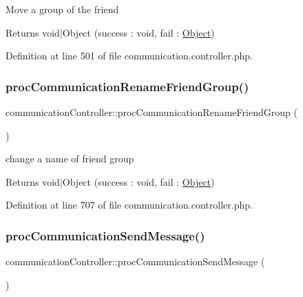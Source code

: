 Move a group of the friend \begin{DoxyReturn}{Returns}
void$\vert$\+Object (success \+: void, fail \+: \hyperlink{classObject}{Object}) 
\end{DoxyReturn}


Definition at line 501 of file communication.\+controller.\+php.

\hypertarget{classcommunicationController_acdfb1b461be46bd6fa56be917fe04d37}{}\label{classcommunicationController_acdfb1b461be46bd6fa56be917fe04d37} 
\subsubsection{\texorpdfstring{proc\+Communication\+Rename\+Friend\+Group()}{procCommunicationRenameFriendGroup()}}
{\footnotesize\ttfamily communication\+Controller\+::proc\+Communication\+Rename\+Friend\+Group (\begin{DoxyParamCaption}{ }\end{DoxyParamCaption})}

change a name of friend group \begin{DoxyReturn}{Returns}
void$\vert$\+Object (success \+: void, fail \+: \hyperlink{classObject}{Object}) 
\end{DoxyReturn}


Definition at line 707 of file communication.\+controller.\+php.

\hypertarget{classcommunicationController_a0461424490faa37eb0ee59f3493bc5c5}{}\label{classcommunicationController_a0461424490faa37eb0ee59f3493bc5c5} 
\subsubsection{\texorpdfstring{proc\+Communication\+Send\+Message()}{procCommunicationSendMessage()}}
{\footnotesize\ttfamily communication\+Controller\+::proc\+Communication\+Send\+Message (\begin{DoxyParamCaption}{ }\end{DoxyParamCaption})}


